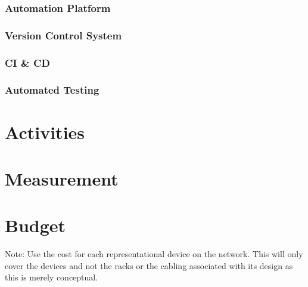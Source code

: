 \documentclass[12pt, letterpaper]{article}
\begin{document}
		\subsubsection{Automation Platform}
		\subsubsection{Version Control System}
		\subsubsection{CI \& CD}
		\subsubsection{Automated Testing}
		

\newpage

\section{Activities}

\newpage

\section{Measurement}

\newpage

\section{Budget}
Note: Use the cost for each representational device on the network.
This will only cover the devices and not the racks or the cabling associated with its design as this is merely conceptual.
\end{document}
